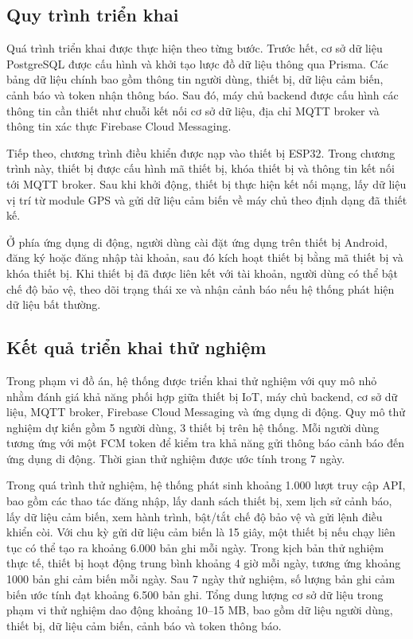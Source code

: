 \documentclass[../DoAn.tex]{subfiles}
\begin{document}
\subsection{Quy trình triển khai}

Quá trình triển khai được thực hiện theo từng bước. Trước hết, cơ sở dữ liệu PostgreSQL được cấu hình và khởi tạo lược đồ dữ liệu thông qua Prisma. Các bảng dữ liệu chính bao gồm thông tin người dùng, thiết bị, dữ liệu cảm biến, cảnh báo và token nhận thông báo. Sau đó, máy chủ backend được cấu hình các thông tin cần thiết như chuỗi kết nối cơ sở dữ liệu, địa chỉ MQTT broker và thông tin xác thực Firebase Cloud Messaging.

Tiếp theo, chương trình điều khiển được nạp vào thiết bị ESP32. Trong chương trình này, thiết bị được cấu hình mã thiết bị, khóa thiết bị và thông tin kết nối tới MQTT broker. Sau khi khởi động, thiết bị thực hiện kết nối mạng, lấy dữ liệu vị trí từ module GPS và gửi dữ liệu cảm biến về máy chủ theo định dạng đã thiết kế.

Ở phía ứng dụng di động, người dùng cài đặt ứng dụng trên thiết bị Android, đăng ký hoặc đăng nhập tài khoản, sau đó kích hoạt thiết bị bằng mã thiết bị và khóa thiết bị. Khi thiết bị đã được liên kết với tài khoản, người dùng có thể bật chế độ bảo vệ, theo dõi trạng thái xe và nhận cảnh báo nếu hệ thống phát hiện dữ liệu bất thường.

\subsection{Kết quả triển khai thử nghiệm}

Trong phạm vi đồ án, hệ thống được triển khai thử nghiệm với quy mô nhỏ nhằm đánh giá khả năng phối hợp giữa thiết bị IoT, máy chủ backend, cơ sở dữ liệu, MQTT broker, Firebase Cloud Messaging và ứng dụng di động. Quy mô thử nghiệm dự kiến gồm 5 người dùng, 3 thiết bị trên hệ thống. Mỗi người dùng tương ứng với một FCM token để kiểm tra khả năng gửi thông báo cảnh báo đến ứng dụng di động. Thời gian thử nghiệm được ước tính trong 7 ngày.

Trong quá trình thử nghiệm, hệ thống phát sinh khoảng 1.000 lượt truy cập API, bao gồm các thao tác đăng nhập, lấy danh sách thiết bị, xem lịch sử cảnh báo, lấy dữ liệu cảm biến, xem hành trình, bật/tắt chế độ bảo vệ và gửi lệnh điều khiển còi. Với chu kỳ gửi dữ liệu cảm biến là 15 giây, một thiết bị nếu chạy liên tục có thể tạo ra khoảng 6.000 bản ghi mỗi ngày. Trong kịch bản thử nghiệm thực tế, thiết bị hoạt động trung bình khoảng 4 giờ mỗi ngày, tương ứng khoảng 1000 bản ghi cảm biến mỗi ngày. Sau 7 ngày thử nghiệm, số lượng bản ghi cảm biến ước tính đạt khoảng 6.500 bản ghi. Tổng dung lượng cơ sở dữ liệu trong phạm vi thử nghiệm dao động khoảng 10--15 MB, bao gồm dữ liệu người dùng, thiết bị, dữ liệu cảm biến, cảnh báo và token thông báo.
\end{document}
